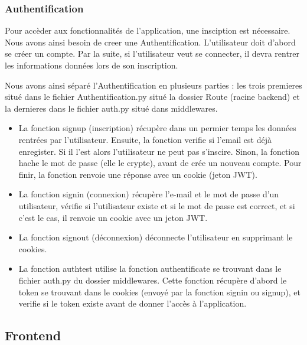 \documentclass[french,a4paper]{article}
\begin{document}
\subsubsection{Authentification}
Pour accèder aux fonctionnalités de l'application, une insciption est nécessaire. Nous avons ainsi besoin de creer une Authentification.
L'utilisateur doit d'abord se créer un compte. Par la suite, si l'utilisateur veut se connecter, il devra rentrer les informations données lors de 
son inscription. 

Nous avons ainsi séparé l'Authentification en plusieurs parties : les trois premieres situé dans le fichier Authentification.py situé
la dossier Route (racine backend) et la dernieres dans le fichier auth.py situé dans middlewares.
\begin{itemize}
    \item La fonction signup (inscription) récupère dans un permier temps les données rentrées par l'utilisateur. Ensuite, la fonction 
verifie si l'email est déjà enregister. Si il l'est alors l'utilisateur ne peut pas s'inscire. Sinon, la fonction hache le mot de 
passe (elle le crypte), avant de crée un nouveau compte. Pour finir, la fonction renvoie une réponse avec un cookie (jeton JWT).
    \item La fonction signin (connexion) récupère l'e-mail et le mot de passe d'un utilisateur, vérifie si l'utilisateur existe et si 
le mot de passe est correct, et si c'est le cas, il renvoie un cookie avec un jeton JWT.
    \item La fonction signout (déconnexion) déconnecte l'utilisateur en supprimant le cookies.
    \item La fonction authtest utilise la fonction authentificate se trouvant dans le fichier auth.py du dossier middlewares. Cette 
fonction récupère d'abord le token se trouvant dans le cookies (envoyé par la fonction signin ou signup), et verifie si le token existe
avant de donner l'accès à l'application.
\end{itemize}

\subsubsection{}
\subsubsection{}
\subsection{Frontend}
\end{document}
